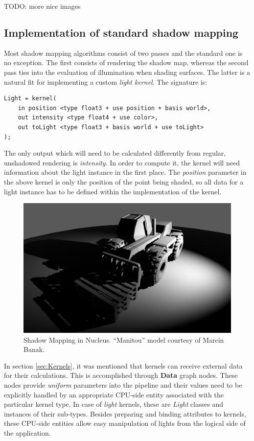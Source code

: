 TODO: more nice images

\subsection{Implementation of standard shadow mapping}

Most shadow mapping algorithms consist of two passes and the standard one is no exception. The first consists of rendering the shadow map, whereas the second pass ties into the evaluation of illumination when shading surfaces. The latter is a natural fit for implementing a custom \emph{light kernel}. The signature is:
	
\begin{lstlisting}[frame=single]
Light = kernel(
    in position <type float3 + use position + basis world>,
    out intensity <type float4 + use color>,
    out toLight <type float3 + basis world + use toLight>
);
\end{lstlisting}

The only output which will need to be calculated differently from regular, unshadowed rendering is \emph{intensity}. In order to compute it, the kernel will need information about the light instance in the first place. The \emph{position} parameter in the above kernel is only the position of the point being shaded, so all data for a light instance has to be defined within the implementation of the kernel.

\begin{figure}[h!]
  \centering
    \includegraphics[width=0.9\linewidth]{./Figures/shadowMapping/manitouSM.png}
    \caption[SM in Nucleus]{Shadow Mapping in Nucleus. ``Manitou'' model courtesy of Marcin Banak.}
  \label{fig:NucleusSM}
\end{figure}

In section \ref{sec:Kernels}, it was mentioned that kernels can receive external data for their calculations. This is accomplished through \textbf{Data} graph nodes. These nodes provide \emph{uniform} parameters into the pipeline and their values need to be explicitly handled by an appropriate CPU-side entity associated with the particular kernel type. In case of \emph{light} kernels, these are \emph{Light} classes and instances of their sub-types. Besides preparing and binding attributes to kernels, these CPU-side entities allow easy manipulation of lights from the logical side of the application.

